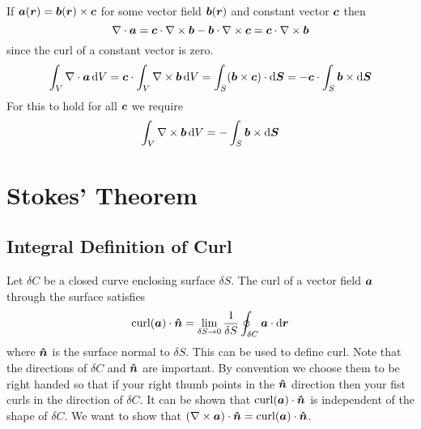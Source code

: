 \documentclass{article}
\newcommand{\curlword}{\mathop{\mathrm{curl}}}
\begin{document}
    If \(\bm{a}(\bm{r}) = \bm{b}(\bm{r})\times \bm{c}\) for some vector field \(\bm{b}(\bm{r})\) and constant vector \(\bm{c}\) then
    \[\nabla\cdot \bm{a} = \bm{c}\cdot\nabla\times\bm{b} - \bm{b}\cdot\nabla\times\bm{c} = \bm{c}\cdot\nabla\times\bm{b}\]
    since the curl of a constant vector is zero.
    \[\int_V\nabla\cdot\bm{a}\,\dd V = \bm{c}\cdot\int_V\nabla\times\bm{b}\,\dd V = \int_S(\bm{b}\times\bm{c})\cdot\dd\bm{S} = -\bm{c}\cdot\int_S\bm{b}\times\dd\bm{S}\]
    For this to hold for all \(\bm{c}\) we require
    \[\int_V\nabla\times\bm{b}\,\dd V = -\int_S\bm{b}\times\dd\bm{S}\]
    
    \section{Stokes' Theorem}
    \subsection{Integral Definition of Curl}
    Let \(\delta C\) be a closed curve enclosing surface \(\delta S\).
    The curl of a vector field \(\bm{a}\) through the surface satisfies
    \[\curlword(\vv a)\cdot\vh n = \lim_{\delta S\to 0}\frac{1}{\delta S}\oint_{\delta C}\vv a\cdot\dd\vv r\]
    where \(\bm{\hat{n}}\) is the surface normal to \(\delta S\).
    This can be used to define curl.
    Note that the directions of \(\delta C\) and \(\bm{\hat{n}}\) are important.
    By convention we choose them to be right handed so that if your right thumb points in the \(\bm{\hat{n}}\) direction then your fist curls in the direction of \(\delta C\).
    It can be shown that \(\curlword(\vv a)\cdot\vh n\) is independent of the shape of \(\delta C\).
    We want to show that \((\curl\vv a)\cdot\vh n = \curlword(\vv a)\cdot\vh n\).
    
\end{document}
